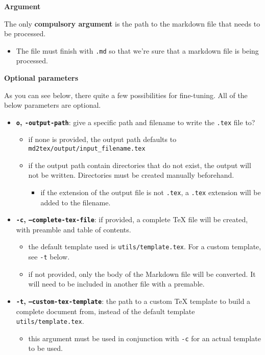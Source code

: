 \noindent{}\textbf{Argument}

The only \textbf{compulsory argument} is the path to the markdown file that needs to be processed.

\begin{itemize}
\item The file must finish with \texttt{.md} so that we're sure that a markdown file is being processed. 
\end{itemize}

\noindent{}\textbf{Optional parameters}

As you can see below, there quite a few possibilities for fine-tuning. All of the below
parameters are optional.

\begin{itemize}
\item \textbf{\texttt{o}, \texttt{-output-path}}: give a specific path and filename to write the \texttt{.tex} file to?
\begin{itemize} 
 \item if none is provided, the output path defaults to \texttt{md2tex/output/input\_filename.tex}
\item if the output path contain directories that do not exist, the output will not be 	 written. Directories must be created manually beforehand.
\begin{itemize} 
 \item if the extension of the output file is not \texttt{.tex}, a \texttt{.tex} extension will be added to the filename.
\end{itemize}
\end{itemize}
\item \textbf{\texttt{-c}, \texttt{--complete-tex-file}}: if provided, a complete TeX file will be created, with preamble and table of contents. 
\begin{itemize} 
 \item the default template used is \texttt{utils/template.tex}. For a custom template, see \texttt{-t} below.
\item if not provided, only the body of the Markdown file will be converted. It will need to be included 	 in another file with a premable.
\end{itemize}
\item \textbf{\texttt{-t}, \texttt{--custom-tex-template}}: the path to a custom TeX template to build a complete document from, instead of the default template \texttt{utils/template.tex}.
\begin{itemize} 
 \item this argument must be used in conjunction with \texttt{-c} for an actual template to be used.

\end{itemize}
\end{itemize}
